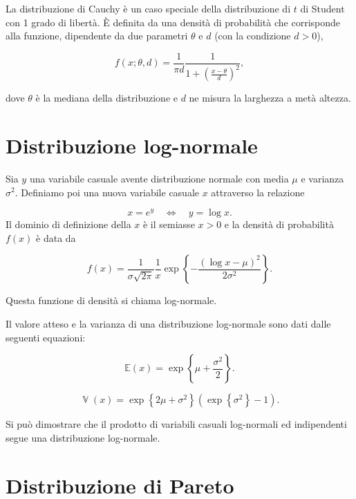 \documentclass[
  11pt,
]{krantz}
\newcommand{\E}{\mathbb{E}} %
\DeclareMathOperator{\Var}{\mathbb{V}} %
\theoremstyle{definition}
\theoremstyle{definition}
\theoremstyle{definition}
\theoremstyle{definition}
\theoremstyle{remark}
\begin{document}
La distribuzione di Cauchy è un caso speciale della distribuzione di \(t\) di Student con 1 grado di libertà. È definita da una densità di probabilità che corrisponde alla funzione, dipendente da due parametri \(\theta\) e \(d\) (con la condizione \(d > 0\)),

\begin{equation}
f(x; \theta, d) = \frac{1}{\pi d} \frac{1}{1 + \left(\frac{x - \theta}{d} \right)^2},
\end{equation}

dove \(\theta\) è la mediana della distribuzione e \(d\) ne misura la larghezza a metà altezza.

\hypertarget{distribuzione-log-normale}{%
\section{Distribuzione log-normale}\label{distribuzione-log-normale}}

Sia \(y\) una variabile casuale avente distribuzione normale con media \(\mu\) e varianza \(\sigma^2\). Definiamo poi una nuova variabile casuale \(x\) attraverso la relazione

\[
x = e^y \quad \Longleftrightarrow \quad y = \log x.
\] Il dominio di definizione della \(x\) è il semiasse \(x > 0\) e la densità di probabilità \(f(x)\) è data da

\begin{equation}
f(x) = \frac{1}{\sigma \sqrt{2 \pi}} \frac{1}{x} \exp \left\{-\frac{(\log x -  \mu)^2}{2 \sigma^2} \right\}.
\end{equation}

Questa funzione di densità si chiama log-normale.

Il valore atteso e la varianza di una distribuzione log-normale sono dati dalle seguenti equazioni:

\begin{equation}
\E(x) = \exp \left\{\mu + \frac{\sigma^2}{2} \right\}.
\end{equation}

\begin{equation}
\Var(x) = \exp \left\{2 \mu + \sigma^2 \right\} \left(\exp \left\{\sigma^2 \right\}  -1\right).
\end{equation}

Si può dimostrare che il prodotto di variabili casuali log-normali ed indipendenti segue una distribuzione log-normale.

\hypertarget{distribuzione-di-pareto}{%
\section{Distribuzione di Pareto}\label{distribuzione-di-pareto}}
\end{document}
